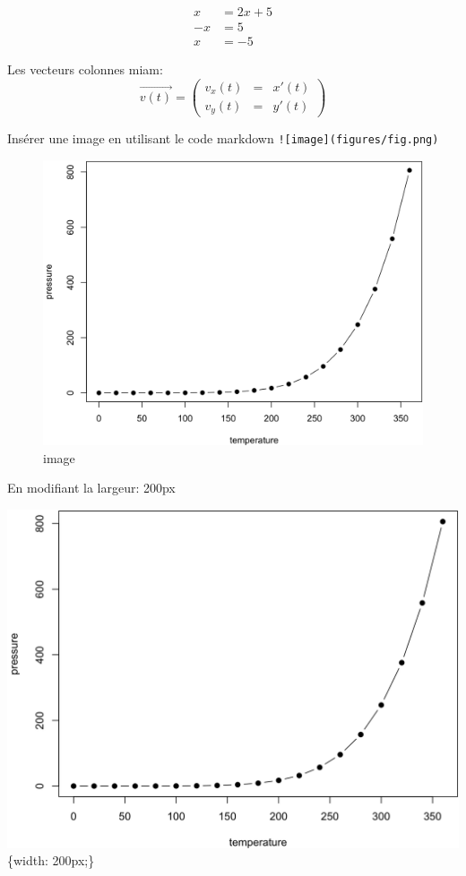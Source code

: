 \documentclass[
]{book}
\begin{document}
\begin{align}
x &= 2x +5 \\
-x &= 5 \\
x &= -5 
\end{align}

Les vecteurs colonnes miam:
\[\overrightarrow{v(t)} = \begin{pmatrix}v_x(t) &=& x'(t)\\
v_y(t) &=& y'(t)
\end{pmatrix}\]

Insérer une image en utilisant le code markdown
\texttt{!{[}image{]}(figures/fig.png)}

\begin{figure}
\centering
\includegraphics{figures/fig.png}
\caption{image}
\end{figure}

En modifiant la largeur: 200px

\includegraphics{figures/fig.png}\{width: 200px;\}
\end{document}

